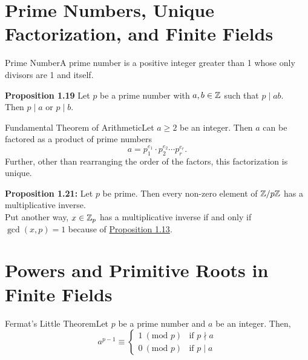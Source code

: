 \section{Prime Numbers, Unique Factorization, and Finite Fields}

\begin{definition}
    {Prime Number}A prime number is a positive integer greater than 1 whose only divisors are 1 and itself.
\end{definition}

\textbf{Proposition 1.19} Let \(p\) be a prime number with \(a,b \in \mathbb{Z}\) such that \(p \mid ab\). \\
Then \(p \mid a\) or \(p \mid b\). \\

\begin{theorem}
    {Fundamental Theorem of Arithmetic}Let \(a \geq 2\) be an integer. Then \(a\) can be factored as a product of prime numbers \[a = p_1^{e_1} \cdot p_2^{e_2} \cdots p_r^{e_r}.\] Further, other than rearranging the order of the factors, this factorization is unique.
\end{theorem}

\textbf{Proposition 1.21:} Let \(p\) be prime. Then every non-zero element of \(\mathbb{Z}/p\mathbb{Z}\) has a multiplicative inverse. \\

Put another way, \(x \in \mathbb{Z}_p\) has a multiplicative inverse if and only if \(\gcd(x,p) = 1\) because of \hyperlink{prop 1.13}{Proposition 1.13}. \\


\pfs%

\section{Powers and Primitive Roots in Finite Fields}
\hypertarget{thm:Fermat's Little Theorem}{}

\begin{theorem}
    {Fermat's Little Theorem}Let \(p\) be a prime number and \(a\) be an integer. Then, \[a^{p - 1} \equiv \begin{cases}
            1 \ (\text{mod } p) & \text{if } p \nmid a \\
            0 \ (\text{mod } p) & \text{if } p \mid a
        \end{cases}\]
\end{theorem}


